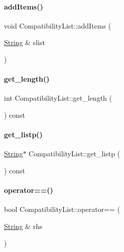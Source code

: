 \paragraph{\texorpdfstring{addItems()}{addItems()}}
{\footnotesize\ttfamily void Compatibility\+List\+::add\+Items (\begin{DoxyParamCaption}\item[{\mbox{\hyperlink{class_string}{String}} \&}]{slist }\end{DoxyParamCaption})}

\mbox{\label{class_compatibility_list_a44d0f7533b66ced7a957f2846e76c4ec}} 
\paragraph{\texorpdfstring{get\_length()}{get\_length()}}
{\footnotesize\ttfamily int Compatibility\+List\+::get\+\_\+length (\begin{DoxyParamCaption}{ }\end{DoxyParamCaption}) const\hspace{0.3cm}{\ttfamily [inline]}}

\mbox{\label{class_compatibility_list_a16642e17369c398c67b04f549f2f77ac}} 
\paragraph{\texorpdfstring{get\_listp()}{get\_listp()}}
{\footnotesize\ttfamily \mbox{\hyperlink{class_string}{String}}$\ast$ Compatibility\+List\+::get\+\_\+listp (\begin{DoxyParamCaption}{ }\end{DoxyParamCaption}) const\hspace{0.3cm}{\ttfamily [inline]}}

\mbox{\label{class_compatibility_list_a3836f2aaefc1753287dd4d6052e17469}} 
\paragraph{\texorpdfstring{operator==()}{operator==()}\hspace{0.1cm}{\footnotesize\ttfamily [1/2]}}
{\footnotesize\ttfamily bool Compatibility\+List\+::operator== (\begin{DoxyParamCaption}\item[{\mbox{\hyperlink{class_string}{String}} \&}]{rhs }\end{DoxyParamCaption})\hspace{0.3cm}{\ttfamily [inline]}}

